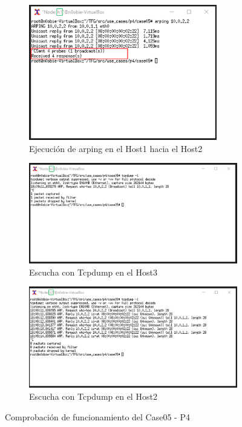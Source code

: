 \begin{figure}[h!]
    \centering
    \begin{subfigure}[b]{\textwidth}
    	\centering
        \includegraphics[width=8.2cm]{archivos/img/dev/p4/case05/demo_case05_1_edited.png}
        \caption{Ejecución de arping en el Host1 hacia el Host2}
        \label{fig:case05_p4_ether_func_ping}
    \end{subfigure}
    \par\bigskip
    \begin{subfigure}[b]{\textwidth}
    	\centering
        \includegraphics[width=12cm]{archivos/img/dev/p4/case05/demo_case05_2_edited.png}
        \caption{Escucha con Tcpdump en el Host3}
        \label{fig:case05_p4_ether_func_list1}
    \end{subfigure}
    \par\bigskip
    \begin{subfigure}[b]{\textwidth}
    	\centering
        \includegraphics[width=12cm]{archivos/img/dev/p4/case05/demo_case05_3_edited.png}
        \caption{Escucha con Tcpdump en el Host2}
        \label{fig:case05_p4_ether_func_list2}
    \end{subfigure}
    
    \caption{Comprobación de funcionamiento del Case05 - P4}
    \label{fig:case05_p4_ether_func1}
\end{figure}

\newpage
